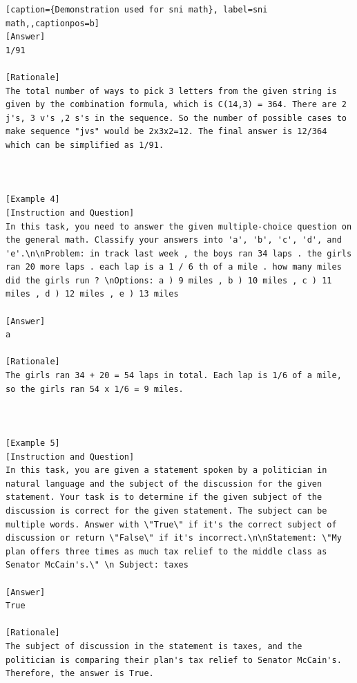 \begin{lstlisting}[caption={Demonstration used for sni math}, label=sni math,,captionpos=b]
[Answer]
1/91

[Rationale]
The total number of ways to pick 3 letters from the given string is given by the combination formula, which is C(14,3) = 364. There are 2 j's, 3 v's ,2 s's in the sequence. So the number of possible cases to make sequence "jvs" would be 2x3x2=12. The final answer is 12/364 which can be simplified as 1/91.



[Example 4]
[Instruction and Question]
In this task, you need to answer the given multiple-choice question on the general math. Classify your answers into 'a', 'b', 'c', 'd', and 'e'.\n\nProblem: in track last week , the boys ran 34 laps . the girls ran 20 more laps . each lap is a 1 / 6 th of a mile . how many miles did the girls run ? \nOptions: a ) 9 miles , b ) 10 miles , c ) 11 miles , d ) 12 miles , e ) 13 miles

[Answer]
a

[Rationale]
The girls ran 34 + 20 = 54 laps in total. Each lap is 1/6 of a mile, so the girls ran 54 x 1/6 = 9 miles.



[Example 5]
[Instruction and Question]
In this task, you are given a statement spoken by a politician in natural language and the subject of the discussion for the given statement. Your task is to determine if the given subject of the discussion is correct for the given statement. The subject can be multiple words. Answer with \"True\" if it's the correct subject of discussion or return \"False\" if it's incorrect.\n\nStatement: \"My plan offers three times as much tax relief to the middle class as Senator McCain's.\" \n Subject: taxes

[Answer]
True

[Rationale]
The subject of discussion in the statement is taxes, and the politician is comparing their plan's tax relief to Senator McCain's. Therefore, the answer is True.




\end{lstlisting}
